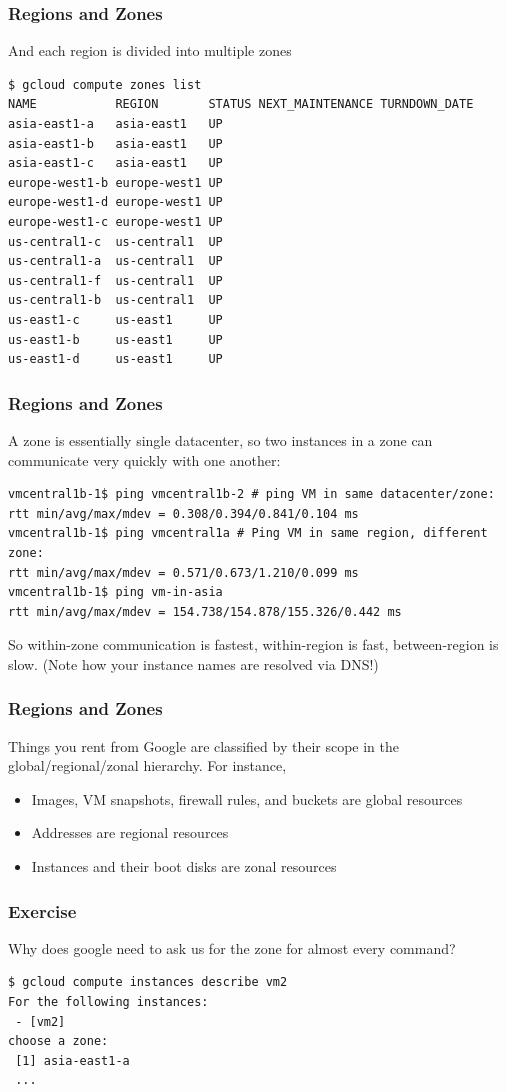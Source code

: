 \documentclass[9pt]{beamer}
\begin{document}
\begin{frame}[fragile]
\frametitle{Regions and Zones}
And each region is divided into multiple zones
\begin{verbatim}
$ gcloud compute zones list
NAME           REGION       STATUS NEXT_MAINTENANCE TURNDOWN_DATE
asia-east1-a   asia-east1   UP
asia-east1-b   asia-east1   UP
asia-east1-c   asia-east1   UP
europe-west1-b europe-west1 UP
europe-west1-d europe-west1 UP
europe-west1-c europe-west1 UP
us-central1-c  us-central1  UP
us-central1-a  us-central1  UP
us-central1-f  us-central1  UP
us-central1-b  us-central1  UP
us-east1-c     us-east1     UP
us-east1-b     us-east1     UP
us-east1-d     us-east1     UP
\end{verbatim}
\end{frame}

\begin{frame}[fragile]
\frametitle{Regions and Zones}
A zone is essentially single datacenter, so two instances in a zone can communicate very quickly with one another:
\begin{verbatim}
vmcentral1b-1$ ping vmcentral1b-2 # ping VM in same datacenter/zone:
rtt min/avg/max/mdev = 0.308/0.394/0.841/0.104 ms
vmcentral1b-1$ ping vmcentral1a # Ping VM in same region, different zone:
rtt min/avg/max/mdev = 0.571/0.673/1.210/0.099 ms
vmcentral1b-1$ ping vm-in-asia 
rtt min/avg/max/mdev = 154.738/154.878/155.326/0.442 ms
\end{verbatim}
 So within-zone communication is fastest, within-region is fast, between-region is slow. (Note how your instance names are resolved via DNS!)
\end{frame}

\begin{frame}[fragile]
\frametitle{Regions and Zones}
Things you rent from Google are classified by their scope in the global/regional/zonal hierarchy. For instance,
\begin{itemize}
\pause
\item Images, VM snapshots, firewall rules, and buckets are global resources
\pause
\item Addresses are regional resources
\pause
\item Instances and their boot disks are zonal resources
\end{itemize}
\end{frame}

\begin{frame}[fragile]
\frametitle{Exercise}
Why does google need to ask us for the zone for almost every command?
\begin{verbatim}
$ gcloud compute instances describe vm2
For the following instances:
 - [vm2]
choose a zone:
 [1] asia-east1-a
 ...
\end{verbatim}
\end{frame}
\end{document}
